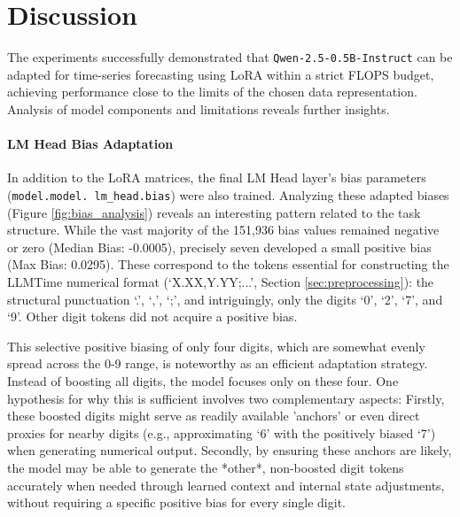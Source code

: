 \documentclass{article}
\begin{document}
\section{Discussion}
\label{sec:discussion}

The experiments successfully demonstrated that \texttt{Qwen-2.5-0.5B-Instruct} can be adapted for time-series forecasting using LoRA within a strict FLOPS budget, achieving performance close to the limits of the chosen data representation. Analysis of model components and limitations reveals further insights.

\paragraph{LM Head Bias Adaptation}
In addition to the LoRA matrices, the final LM Head layer's bias parameters (\texttt{model.model. lm\_head.bias}) were also trained. Analyzing these adapted biases (Figure \ref{fig:bias_analysis}) reveals an interesting pattern related to the task structure. While the vast majority of the 151,936 bias values remained negative or zero (Median Bias: -0.0005), precisely seven developed a small positive bias (Max Bias: 0.0295). These correspond to the tokens essential for constructing the LLMTime numerical format (`X.XX,Y.YY;...', Section \ref{sec:preprocessing}): the structural punctuation `.', `,', `;', and intriguingly, only the digits `0', `2', `7', and `9'. Other digit tokens did not acquire a positive bias.


This selective positive biasing of only four digits, which are somewhat evenly spread across the 0-9 range, is noteworthy as an efficient adaptation strategy. Instead of boosting all digits, the model focuses only on these four. One hypothesis for why this is sufficient involves two complementary aspects: Firstly, these boosted digits might serve as readily available 'anchors' or even direct proxies for nearby digits (e.g., approximating `6' with the positively biased `7') when generating numerical output. Secondly, by ensuring these anchors are likely, the model may be able to generate the *other*, non-boosted digit tokens accurately when needed through learned context and internal state adjustments, without requiring a specific positive bias for every single digit.
\end{document}
